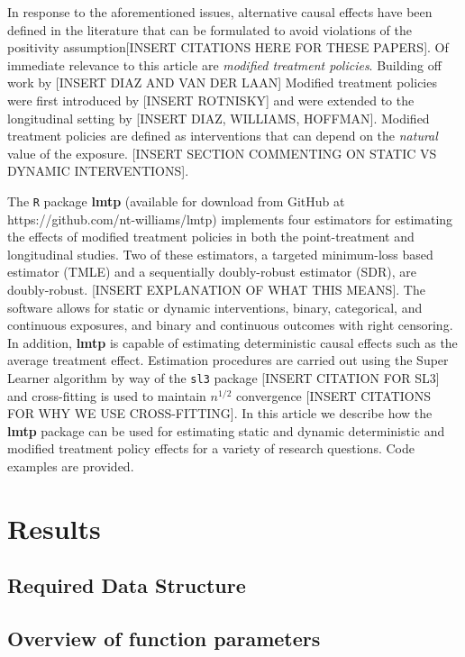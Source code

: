 \documentclass[]{elsarticle} %
\begin{document}
In response to the aforementioned issues, alternative causal effects
have been defined in the literature that can be formulated to avoid
violations of the positivity assumption{[}INSERT CITATIONS HERE FOR
THESE PAPERS{]}. Of immediate relevance to this article are
\emph{modified treatment policies}. Building off work by {[}INSERT DIAZ
AND VAN DER LAAN{]} Modified treatment policies were first introduced by
{[}INSERT ROTNISKY{]} and were extended to the longitudinal setting by
{[}INSERT DIAZ, WILLIAMS, HOFFMAN{]}. Modified treatment policies are
defined as interventions that can depend on the \emph{natural} value of
the exposure. {[}INSERT SECTION COMMENTING ON STATIC VS DYNAMIC
INTERVENTIONS{]}.

The \texttt{R} package \textbf{lmtp} (available for download from GitHub
at https://github.com/nt-williams/lmtp) implements four estimators for
estimating the effects of modified treatment policies in both the
point-treatment and longitudinal studies. Two of these estimators, a
targeted minimum-loss based estimator (TMLE) and a sequentially
doubly-robust estimator (SDR), are doubly-robust. {[}INSERT EXPLANATION
OF WHAT THIS MEANS{]}. The software allows for static or dynamic
interventions, binary, categorical, and continuous exposures, and binary
and continuous outcomes with right censoring. In addition, \textbf{lmtp}
is capable of estimating deterministic causal effects such as the
average treatment effect. Estimation procedures are carried out using
the Super Learner algorithm by way of the \texttt{sl3} package {[}INSERT
CITATION FOR SL3{]} and cross-fitting is used to maintain \(n^{1/2}\)
convergence {[}INSERT CITATIONS FOR WHY WE USE CROSS-FITTING{]}. In this
article we describe how the \textbf{lmtp} package can be used for
estimating static and dynamic deterministic and modified treatment
policy effects for a variety of research questions. Code examples are
provided.

\hypertarget{results}{%
\section{Results}\label{results}}

\hypertarget{required-data-structure}{%
\subsection{Required Data Structure}\label{required-data-structure}}

\hypertarget{overview-of-function-parameters}{%
\subsection{Overview of function
parameters}\label{overview-of-function-parameters}}
\end{document}
